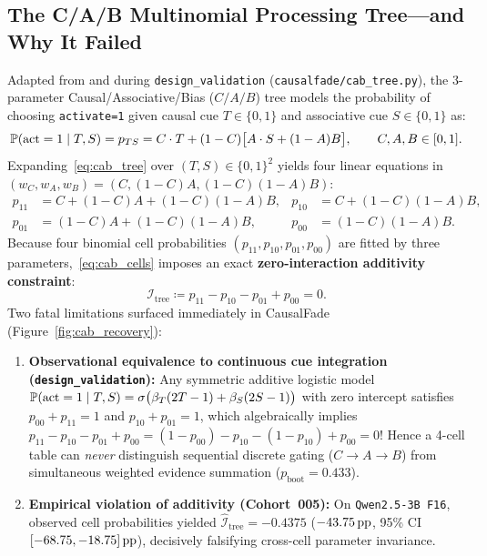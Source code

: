 \subsection{The C/A/B Multinomial Processing Tree---and Why It Failed}
Adapted from \citet{jacoby1991process} and \citet{gawronski2017cni} during \texttt{design\_validation} (\texttt{causalfade/cab\_tree.py}), the 3-parameter Causal/Associative/Bias ($C/A/B$) tree models the probability of choosing \texttt{activate=1} given causal cue $T \in \{0,1\}$ and associative cue $S \in \{0,1\}$ as:
\begin{equation}
  \mathbb{P}(\text{act}=1 \mid T, S) = p_{TS} = C \cdot T + (1 - C)\bigl[A \cdot S + (1 - A) B\bigr], \qquad C, A, B \in [0,1].
  \label{eq:cab_tree}
\end{equation}
Expanding~\eqref{eq:cab_tree} over $(T,S) \in \{0,1\}^2$ yields four linear equations in $(w_C, w_A, w_B) = (C, (1-C)A, (1-C)(1-A)B)$:
\begin{align}
  p_{11} &= C + (1-C)A + (1-C)(1-A)B, & p_{10} &= C + (1-C)(1-A)B, \nonumber\\
  p_{01} &= (1-C)A + (1-C)(1-A)B,     & p_{00} &= (1-C)(1-A)B. \label{eq:cab_cells}
\end{align}
Because four binomial cell probabilities $(p_{11}, p_{10}, p_{01}, p_{00})$ are fitted by three parameters,~\eqref{eq:cab_cells} imposes an exact \textbf{zero-interaction additivity constraint}:
\begin{equation}
  \mathcal{I}_{\mathrm{tree}} \coloneqq p_{11} - p_{10} - p_{01} + p_{00} = 0.
  \label{eq:cab_additivity}
\end{equation}
Two fatal limitations surfaced immediately in CausalFade (Figure~\ref{fig:cab_recovery}):
\begin{enumerate}
  \item \textbf{Observational equivalence to continuous cue integration (\texttt{design\_validation}):} Any symmetric additive logistic model $\mathbb{P}(\text{act}=1\mid T,S) = \sigma\bigl(\beta_T(2T-1) + \beta_S(2S-1)\bigr)$ with zero intercept satisfies $p_{00} + p_{11} = 1$ and $p_{10} + p_{01} = 1$, which algebraically implies $p_{11} - p_{10} - p_{01} + p_{00} = (1-p_{00}) - p_{10} - (1-p_{10}) + p_{00} = 0$! Hence a 4-cell table can \emph{never} distinguish sequential discrete gating ($C \to A \to B$) from simultaneous weighted evidence summation ($p_{\text{boot}} = 0.433$).
  \item \textbf{Empirical violation of additivity (Cohort~005):} On \texttt{Qwen2.5-3B F16}, observed cell probabilities yielded $\widehat{\mathcal{I}}_{\mathrm{tree}} = -0.4375$ ($-43.75\,\mathrm{pp}$, 95\% CI $[-68.75, -18.75]\,\mathrm{pp}$), decisively falsifying cross-cell parameter invariance.
\end{enumerate}

